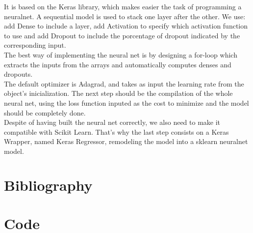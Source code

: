 \documentclass[a4paper,11pt,spanish]{report}
\begin{document}
It is based on the Keras library, which makes easier the task of programming a neuralnet. A sequential model is used to stack one layer after the other. We use: add Dense to include a layer, add Activation to specify which activation function to use and add Dropout to include the porcentage of dropout indicated by the corresponding input.\\
The best way of implementing the neural net is by designing a for-loop which extracts the inputs from the arrays and automatically computes denses and dropouts.\\
The default optimizer is Adagrad, and takes as input the learning rate from the object's inicialization. The next step should be the compilation of the whole neural net, using the loss function inputed as the cost to minimize and the model should be completely done.\\
Despite of having built the neural net correctly, we also need to make it compatible with Scikit Learn. That's why the last step consists on a Keras Wrapper, named Keras Regressor, remodeling the model into a sklearn neuralnet model.


\chapter*{Bibliography}
\label{chap:bib}

\nocite{*}

% 


\chapter*{Code}
\label{chap:code}


\end{document}
